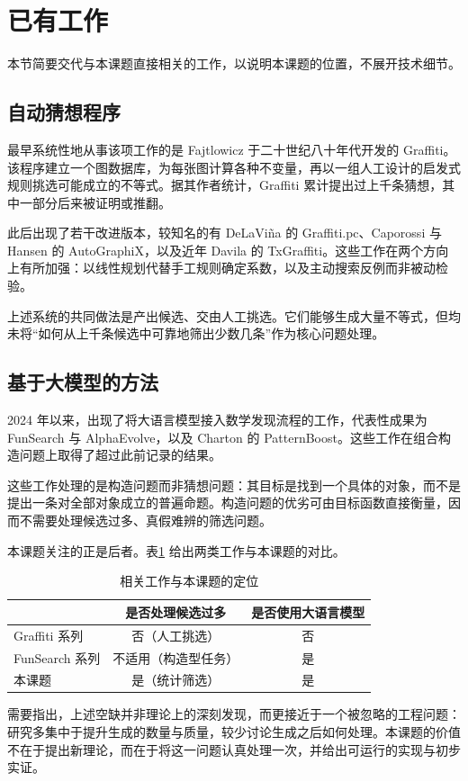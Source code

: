 
\section{已有工作}
\label{sec:background}

本节简要交代与本课题直接相关的工作，以说明本课题的位置，不展开技术细节。

\subsection{自动猜想程序}

最早系统性地从事该项工作的是 Fajtlowicz 于二十世纪八十年代开发的 Graffiti。该程序建立一个图数据库，为每张图计算各种不变量，再以一组人工设计的启发式规则挑选可能成立的不等式。据其作者统计，Graffiti 累计提出过上千条猜想，其中一部分后来被证明或推翻。

此后出现了若干改进版本，较知名的有 DeLaViña 的 Graffiti.pc、Caporossi 与 Hansen 的 AutoGraphiX，以及近年 Davila 的 TxGraffiti。这些工作在两个方向上有所加强：以线性规划代替手工规则确定系数，以及主动搜索反例而非被动检验。

上述系统的共同做法是产出候选、交由人工挑选。它们能够生成大量不等式，但均未将“如何从上千条候选中可靠地筛出少数几条”作为核心问题处理。

\subsection{基于大模型的方法}

2024 年以来，出现了将大语言模型接入数学发现流程的工作，代表性成果为 FunSearch 与 AlphaEvolve，以及 Charton 的 PatternBoost。这些工作在组合构造问题上取得了超过此前记录的结果。

这些工作处理的是构造问题而非猜想问题：其目标是找到一个具体的对象，而不是提出一条对全部对象成立的普遍命题。构造问题的优劣可由目标函数直接衡量，因而不需要处理候选过多、真假难辨的筛选问题。

本课题关注的正是后者。表\ref{tab:position} 给出两类工作与本课题的对比。

\begin{table}[H]
\centering
\small
\caption{相关工作与本课题的定位}
\label{tab:position}
\begin{tabular}{@{}lcc@{}}
\toprule
 & 是否处理候选过多 & 是否使用大语言模型 \\
\midrule
Graffiti 系列 & 否（人工挑选） & 否 \\
FunSearch 系列 & 不适用（构造型任务） & 是 \\
本课题 & 是（统计筛选） & 是 \\
\bottomrule
\end{tabular}
\end{table}

需要指出，上述空缺并非理论上的深刻发现，而更接近于一个被忽略的工程问题：研究多集中于提升生成的数量与质量，较少讨论生成之后如何处理。本课题的价值不在于提出新理论，而在于将这一问题认真处理一次，并给出可运行的实现与初步实证。
